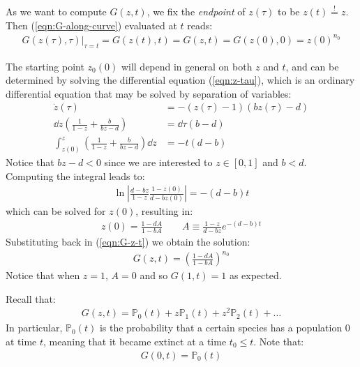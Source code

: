 \documentclass[../../main.tex]{subfiles}
\begin{document}
\medskip

As we want to compute $G(z,t)$, we fix the \textit{endpoint} of $z(\tau)$ to be $z(t) \overset{!}{=} z$. Then (\ref{eqn:G-along-curve}) evaluated at $t$ reads:
\begin{align}\label{eqn:G-z-t}
    G(z(\tau), \tau) \Big|_{\tau = t} = G(z(t), t) = G(z, t) = G(z(0), 0) = z(0)^{n_0}
\end{align}

The starting point $z_0(0)$ will depend in general on both $z$ and $t$, and can be determined by solving the differential equation (\ref{eqn:z-tau}), which is an ordinary differential equation that may be solved by separation of variables:
\begin{align*}
    \dot{z}(\tau) &= - (z(\tau) - 1)(b z(\tau) - d)\\
    \dd{z} \left(\frac{1}{1-z} + \frac{b}{bz -d}  \right) &= \dd{\tau} (b-d)\\
    \int_{z(0)}^z \left(\frac{1}{1-z} + \frac{b}{bz -d}  \right)\dd{z} &= - t(d-b)
\end{align*}
Notice that $bz-d < 0$ since we are interested to $z \in [0,1]$ and $b < d$. Computing the integral leads to:
\begin{align*}
    \ln \left| \frac{d-bz}{1-z} \frac{1-z(0)}{d-bz(0)}  \right| = -(d-b) t
\end{align*}
which can be solved for $z(0)$, resulting in:
\begin{align*}
    z(0) = \frac{1 - dA}{1-bA} \qquad A \equiv \frac{1-z}{d-bz} e^{-(d-b)t}  
\end{align*}
Substituting back in (\ref{eqn:G-z-t}) we obtain the solution:
\begin{align}\label{eqn:extinction-generating}
    G(z,t) = \left(\frac{1-dA}{1-bA} \right)^{n_0}
\end{align}
Notice that when $z=1$, $A=0$ and so $G(1,t) = 1$ as expected.

\medskip

Recall that:
\begin{align*}
    G(z,t) = \mathbb{P}_0(t) + z \mathbb{P}_1(t) + z^2 \mathbb{P}_2(t) + \dots
\end{align*}
In particular, $\mathbb{P}_0(t)$ is the probability that a certain species has a population $0$ at time $t$, meaning that it became extinct at a time $t_0 \leq t$. Note that:
\begin{align*}
    G(0,t) = \mathbb{P}_0(t)
\end{align*}

\medskip
\end{document}
